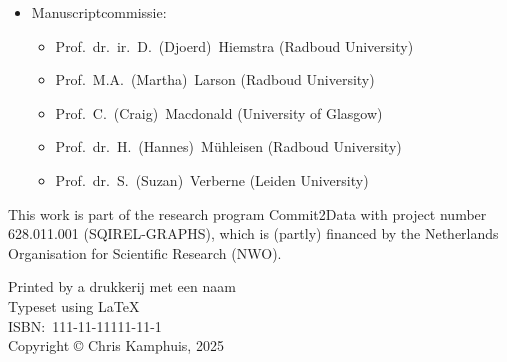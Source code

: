 \begin{itemize}
	\item[] Manuscriptcommissie:
	\begin{itemize}
		\item[] {Prof.\ dr.\ ir.\ D.\ (Djoerd)\ Hiemstra\hfill} (Radboud University)
		\item[] {Prof.\ M.A.\ (Martha)\ Larson\hfill} (Radboud University)
		\item[] {Prof.\ C.\ (Craig)\ Macdonald\hfill} (University of Glasgow)
		\item[] {Prof.\ dr.\ H.\ (Hannes)\ Mühleisen\hfill} (Radboud University) 
		\item[] {Prof.\ dr.\ S.\ (Suzan)\ Verberne\hfill} (Leiden University) 
	\end{itemize}
\end{itemize}

\vfill

\noindent%
\begin{minipage}[b][][b]{0.95\textwidth} %
	{
		\setlength{\parindent}{0cm}%
		This work is part of the research program Commit2Data with project number 628.011.001 (SQIREL-GRAPHS), which is (partly) financed by the Netherlands Organisation for Scientific Research (NWO).
		
	}
	
	\vspace{0.25cm}
	
	{
		\setlength{\parindent}{0cm}%
		Printed by a drukkerij met een naam\\[\baselineskip]
		Typeset using \LaTeX\\[\baselineskip]
		ISBN:\ 111{-}11{-}11111{-}11{-}1\\[\baselineskip]
		Copyright \copyright{} Chris Kamphuis, 2025\\[\baselineskip]
	}
\end{minipage}%
